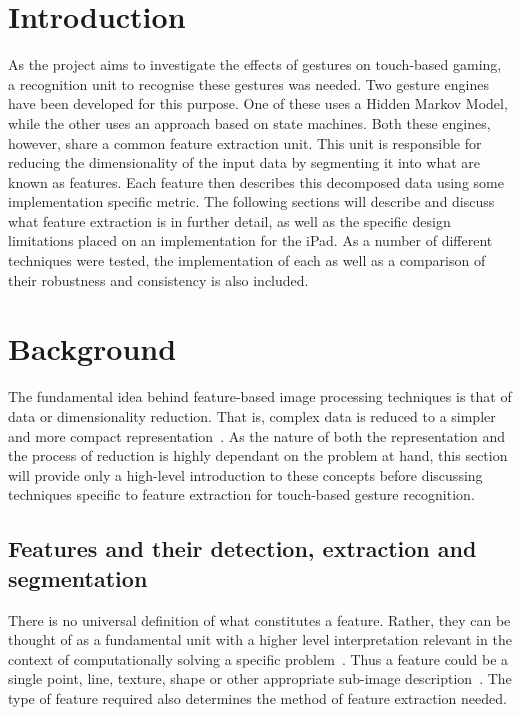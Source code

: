 \graphicspath{{./FEimages/}}

\section{Introduction}
As the project aims to investigate the effects of gestures on touch-based gaming, a recognition unit to recognise these gestures was needed. Two gesture engines have been developed for this purpose. One of these uses a Hidden Markov Model, while the other uses an approach based on state machines. Both these engines, however, share a common feature extraction unit. This unit is responsible for reducing the dimensionality of the input data by segmenting it into what are known as features. Each feature then describes this decomposed data using some implementation specific metric. The following sections will describe and discuss what feature extraction is in further detail, as well as the specific design limitations placed on an implementation for the iPad. As a number of different techniques were tested, the implementation of each as well as a comparison of their robustness and consistency is also included.


\section{Background}
The fundamental idea behind feature-based image processing techniques is that of data or dimensionality reduction. That is, complex data is reduced to a simpler and more compact representation~\citep{Guyo06}. As the nature of both the representation and the process of reduction is highly dependant on the problem at hand, this section will provide only a high-level introduction to these concepts before discussing techniques specific to feature extraction for touch-based gesture recognition.

\subsection{Features and their detection, extraction and segmentation}
There is no universal definition of what constitutes a feature. Rather, they can be thought of as a fundamental unit with a higher level interpretation relevant in the context of computationally solving a specific problem~\citep{Erda08}. Thus a feature could be a single point, line, texture, shape or other appropriate sub-image description~\citep{Mara10}. The type of feature required also determines the method of feature extraction needed. 

